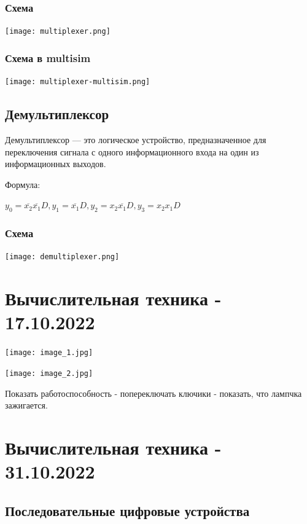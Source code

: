 \documentclass{article}
\begin{document}
\begin{flushleft}
\subsubsection{Схема}

\texttt{[image: multiplexer.png]}

\subsubsection{Схема в multisim}

\texttt{[image: multiplexer-multisim.png]}

\subsection{Демультиплексор}

Демультиплексор — это логическое устройство, предназначенное для переключения сигнала с одного информационного входа на один из информационных выходов.

\hfill

Формула:

$y_0 = \overline{x_2} \overline{x_1} D, y_1 = \overline{x_1}D, y_2 = x_2\overline{x_1}D, y_3 = x_2 x_1 D$

\subsubsection{Схема}

\texttt{[image: demultiplexer.png]}

\pagebreak
\section{Вычислительная техника - 17.10.2022}

\texttt{[image: image\_1.jpg]}

\texttt{[image: image\_2.jpg]}

Показать работоспособность - попереключать ключики - показать, что лампчка зажигается.

\end{flushleft}

\pagebreak
\section{Вычислительная техника - 31.10.2022}

\subsection{Последовательные цифровые устройства}
\end{document}

